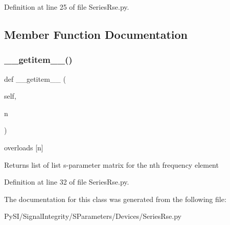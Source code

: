 Definition at line 25 of file Series\+Rse.\+py.



\subsection{Member Function Documentation}
\mbox{\label{classSignalIntegrity_1_1SParameters_1_1Devices_1_1SeriesRse_1_1SeriesRse_ab7a6da5139e0878b590d68292aaa70f2}} 
\subsubsection{\texorpdfstring{\+\_\+\+\_\+getitem\+\_\+\+\_\+()}{\_\_getitem\_\_()}}
{\footnotesize\ttfamily def \+\_\+\+\_\+getitem\+\_\+\+\_\+ (\begin{DoxyParamCaption}\item[{}]{self,  }\item[{}]{n }\end{DoxyParamCaption})}



overloads \mbox{[}n\mbox{]} 

\begin{DoxyReturn}{Returns}
list of list s-\/parameter matrix for the nth frequency element 
\end{DoxyReturn}


Definition at line 32 of file Series\+Rse.\+py.



The documentation for this class was generated from the following file\+:\begin{DoxyCompactItemize}
\item 
Py\+S\+I/\+Signal\+Integrity/\+S\+Parameters/\+Devices/Series\+Rse.\+py\end{DoxyCompactItemize}
